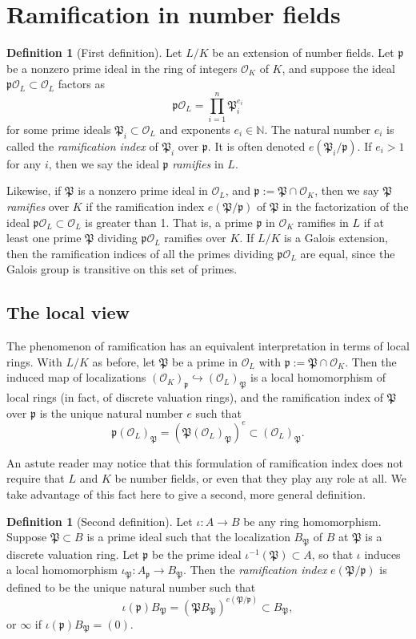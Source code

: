 \documentclass[12pt]{article}
\newcommand{\p}{{\mathfrak{p}}}
\renewcommand{\P}{{\mathfrak{P}}}
\newcommand{\N}{\mathbb{N}}
\renewcommand{\O}{\mathcal{O}}
\newcommand{\lra}{\longrightarrow}
\newcommand{\intersect}{\cap}
\theoremstyle{definition}
\newtheorem{definition}[theorem]{Definition}
\begin{document}
\section{Ramification in number fields}

\begin{definition}[First definition]\label{definition-1}
Let $L/K$ be an extension of number fields. Let $\p$ be a nonzero
prime ideal in the ring of integers $\O_K$ of $K$, and suppose the
ideal $\p \O_L \subset \O_L$ factors as
$$
\p \O_L = \prod_{i=1}^n \P_i^{e_i}
$$
for some prime ideals $\P_i \subset \O_L$ and exponents $e_i \in
\N$. The natural number $e_i$ is called the {\em ramification index}
of $\P_i$ over $\p$. It is often denoted $e(\P_i/\p)$. If $e_i > 1$
for any $i$, then we say the ideal $\p$ {\em ramifies} in $L$.

Likewise, if $\P$ is a nonzero prime ideal in $\O_L$, and $\p := \P
\intersect \O_K$, then we say $\P$ {\em ramifies} over $K$ if the
ramification index $e(\P/\p)$ of $\P$ in the factorization of the
ideal $\p \O_L \subset \O_L$ is greater than 1. That is, a prime $\p$
in $\O_K$ ramifies in $L$ if at least one prime $\P$ dividing $\p
\O_L$ ramifies over $K$. If $L/K$ is a Galois extension, then the
ramification indices of all the primes dividing $\p \O_L$ are equal,
since the Galois group is transitive on this set of primes.
\end{definition}

\subsection{The local view}

The phenomenon of ramification has an equivalent interpretation in
terms of local rings. With $L/K$ as before, let $\P$ be a prime in
$\O_L$ with $\p := \P \intersect \O_K$. Then the induced map of
localizations $(\O_K)_\p \hookrightarrow (\O_L)_\P$ is a local
homomorphism of local rings (in fact, of discrete valuation rings),
and the ramification index of $\P$ over $\p$ is the unique natural
number $e$ such that
$$
\p (\O_L)_\P = (\P (\O_L)_\P)^e \subset (\O_L)_\P.
$$

An astute reader may notice that this formulation of ramification
index does not require that $L$ and $K$ be number fields, or even that
they play any role at all. We take advantage of this fact here to give
a second, more general definition.

\begin{definition}[Second definition]\label{definition-2}
Let $\iota: A \lra B$ be any ring homomorphism. Suppose $\P \subset B$
is a prime ideal such that the localization $B_\P$ of $B$ at $\P$ is a
discrete valuation ring. Let $\p$ be the prime ideal $\iota^{-1}(\P)
\subset A$, so that $\iota$ induces a local homomorphism $\iota_\P:
A_\p \lra B_\P$. Then the {\em ramification index} $e(\P/\p)$ is
defined to be the unique natural number such that
$$
\iota(\p)B_\P = (\P B_\P)^{e(\P/\p)} \subset B_\P,
$$
or $\infty$ if $\iota(\p)B_\P = (0)$.
\end{definition}
\end{document}
